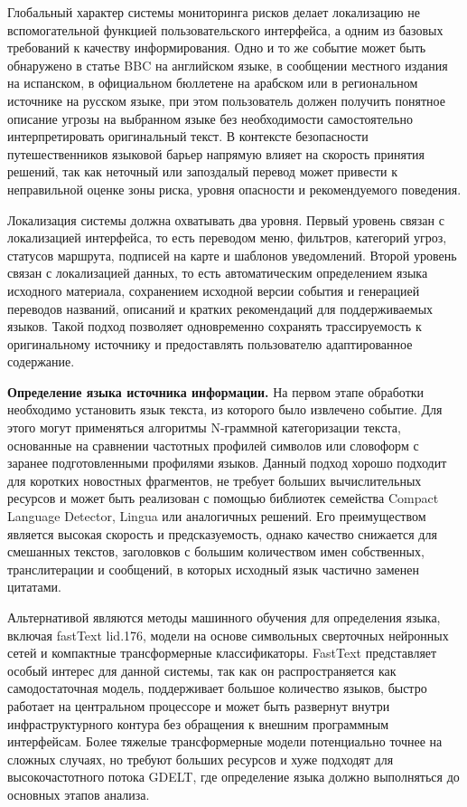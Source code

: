 Глобальный характер системы мониторинга рисков делает локализацию не вспомогательной функцией пользовательского интерфейса, а одним из базовых требований к качеству информирования. Одно и то же событие может быть обнаружено в статье BBC на английском языке, в сообщении местного издания на испанском, в официальном бюллетене на арабском или в региональном источнике на русском языке, при этом пользователь должен получить понятное описание угрозы на выбранном языке без необходимости самостоятельно интерпретировать оригинальный текст. В контексте безопасности путешественников языковой барьер напрямую влияет на скорость принятия решений, так как неточный или запоздалый перевод может привести к неправильной оценке зоны риска, уровня опасности и рекомендуемого поведения.

Локализация системы должна охватывать два уровня. Первый уровень связан с локализацией интерфейса, то есть переводом меню, фильтров, категорий угроз, статусов маршрута, подписей на карте и шаблонов уведомлений. Второй уровень связан с локализацией данных, то есть автоматическим определением языка исходного материала, сохранением исходной версии события и генерацией переводов названий, описаний и кратких рекомендаций для поддерживаемых языков. Такой подход позволяет одновременно сохранять трассируемость к оригинальному источнику и предоставлять пользователю адаптированное содержание.

\textbf{Определение языка источника информации.} На первом этапе обработки необходимо установить язык текста, из которого было извлечено событие. Для этого могут применяться алгоритмы N-граммной категоризации текста, основанные на сравнении частотных профилей символов или словоформ с заранее подготовленными профилями языков. Данный подход хорошо подходит для коротких новостных фрагментов, не требует больших вычислительных ресурсов и может быть реализован с помощью библиотек семейства Compact Language Detector, Lingua или аналогичных решений\cite{lingua_language_detector_bib}. Его преимуществом является высокая скорость и предсказуемость, однако качество снижается для смешанных текстов, заголовков с большим количеством имен собственных, транслитерации и сообщений, в которых исходный язык частично заменен цитатами.

Альтернативой являются методы машинного обучения для определения языка, включая fastText lid.176, модели на основе символьных сверточных нейронных сетей и компактные трансформерные классификаторы\cite{fasttext_language_identification_bib}. FastText представляет особый интерес для данной системы, так как он распространяется как самодостаточная модель, поддерживает большое количество языков, быстро работает на центральном процессоре и может быть развернут внутри инфраструктурного контура без обращения к внешним программным интерфейсам. Более тяжелые трансформерные модели потенциально точнее на сложных случаях, но требуют больших ресурсов и хуже подходят для высокочастотного потока GDELT, где определение языка должно выполняться до основных этапов анализа.


